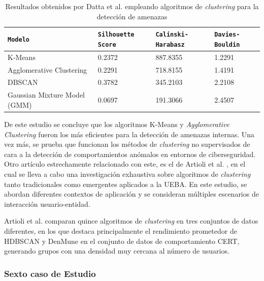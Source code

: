 \begin{table}[H]
\centering
\footnotesize
\begin{tabularx}{\textwidth}{|X|X|X|X|}
\hline
\rowcolor{graylight} \texttt{Modelo} & \texttt{Silhouette Score} & \texttt{Calinski-Harabasz} & \texttt{Davies-Bouldin} \\ \hline
K-Means & 0.2372 & 887.8355 & 1.2291 \\ \hline
Agglomerative Clustering & 0.2291 & 718.8155 & 1.4191 \\ \hline
DBSCAN & 0.3782 & 345.2103 & 2.2108 \\ \hline
Gaussian Mixture Model (GMM) & 0.0697 & 191.3066 & 2.4507 \\ \hline
\end{tabularx}
\caption{Resultados obtenidos por Datta et al. \cite{9614848} empleando algoritmos de \textit{clustering} para la detección de amenazas}
\label{tab:ueba-results}
\end{table}

De este estudio se concluye que los algoritmos K-Means y \textit{Agglomerative Clustering} fueron los más eficientes para la detección de amenazas internas. Una vez más, se prueba que funcionan los métodos de \textit{clustering} no supervisados de cara a la detección de comportamientos anómalos en entornos de ciberseguridad. \\

Otro artículo estrechamente relacionado con este, es el de Artioli et al. \cite{artioli2024comprehensive}, en el cual se lleva a cabo una investigación exhaustiva sobre algoritmos de \textit{clustering} tanto tradicionales como emergentes aplicados a la \gls{UEBA}. En este estudio, se abordan diferentes contextos de aplicación y se consideran múltiples escenarios de interacción usuario-entidad. 

Artioli et al. comparan quince algoritmos de \textit{clustering} en tres conjuntos de datos diferentes, en los que destaca principalmente el rendimiento prometedor de \gls{HDBSCAN} y \gls{DenMune} en el conjunto de datos de comportamiento \gls{CERT}, generando grupos con una densidad muy cercana al número de usuarios.



\subsubsection*{Sexto caso de Estudio}


